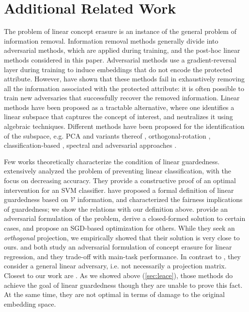 \documentclass{article}
\theoremstyle{plain}
\theoremstyle{remark}
\theoremstyle{plain}
\theoremstyle{TheoremNum}
\begin{document}
\section{Additional Related Work}
The problem of linear concept erasure is an instance of the general problem of information removal. Information removal methods generally divide into adversarial methods, which are applied during training, and the post-hoc linear methods considered in this paper. Adversarial methods \citep{edwards2015censoring,xie2017controllable, chen2018adversarial,elazar-goldberg-2018-adversarial, zhang2018mitigating} use a gradient-reversal layer during training to induce embeddings that do not encode the protected attribute. However, \citet{elazar-goldberg-2018-adversarial} have shown that these methods fail in exhaustively removing all the information associated with the protected attribute: it is often possible to train new adversaries that successfully recover the removed information. Linear methods have been proposed as a tractable alternative, where one identifies a linear subspace that captures the concept of interest, and neutralizes it using algebraic techniques. Different methods have been proposed for the identification of the subspace, e.g. PCA and variants thereof \citep{bolukbasi2016man, kleindessner2023efficient}, orthogonal-rotation \citep{dev2020oscar}, classification-based \citep{ravfogel-etal-2020-null}, spectral \citep{shao-etal-2023-gold, shao2023erasure} and adversarial approaches \citep{ravfogel2022rlace}. 

Few works theoretically characterize the condition of linear guardedness. \citet{haghighatkhah2021obstructing} extensively analyzed the problem of preventing linear classification, with the focus on decreasing accuracy. They provide a constructive proof of an optimal intervention for an SVM classifier. \citet{ravfogel2022linear} have proposed a formal definition of linear guardedness based on $\mathcal{V}$ information, and characterized the fairness implications of guardedness; we show the relations with our definition above. \citet{ravfogel2022rlace} provide an adversarial formulation of the problem, derive a closed-formed solution to certain cases, and propose an SGD-based optimization for others. While they seek an \emph{orthogonal} projection, we empirically showed that their solution is very close to ours. \citet{sadeghi2019global} and \citet{sadeghi2021fundamental} both study an adversarial formulation of concept erasure for linear regression, and they trade-off with main-task performance. In contrast to \citet{ravfogel2022rlace}, they consider a general linear adversary, i.e. not necessarily a projection matrix.  Closest to our work are \citet{kleindessner2023efficient, haghighatkhah2022better, shao-etal-2023-gold}. As we showed above (\cref{sec:leace}), those methods do achieve the goal of linear guardedness though they are unable to prove this fact. At the same time, they are not optimal in terms of damage to the original embedding space.
\end{document}
